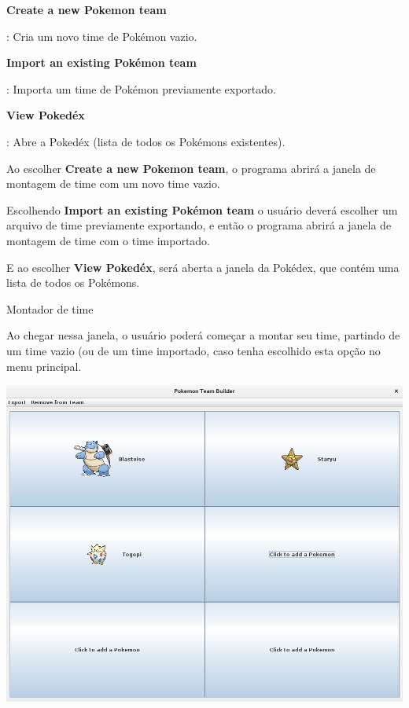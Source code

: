 \documentclass[
	article,			%
	12pt,				%
	oneside,			%
	a4paper,			%
	english,			%
	brazil,				%
	sumario=tradicional
	]{abntex2}
\begin{document}
\begin{itemize}

{\item\bfseries Create a new Pokemon team}: Cria um novo time de Pokémon vazio.

{\item\bfseries Import an existing Pokémon team}: Importa um time de Pokémon previamente exportado.

{\item\bfseries View Pokedéx}: Abre a Pokedéx (lista de todos os Pokémons existentes).

\end{itemize}

Ao escolher {\bfseries Create a new Pokemon team}, o programa abrirá a janela de montagem de time com um novo time vazio.

Escolhendo {\bfseries Import an existing Pokémon team} o usuário deverá escolher um arquivo de time previamente exportando, e então o programa abrirá a janela de montagem de time com o time importado.

E ao escolher {\bfseries View Pokedéx}, será aberta a janela da Pokédex, que contém uma lista de todos os Pokémons.

\newpage
\begin{center}
{\Large Montador de time}
\end{center}

Ao chegar nessa janela, o usuário poderá começar a montar seu time, partindo de um time vazio (ou de um time importado, caso tenha escolhido esta opção no menu principal.

\begin{center}
\includegraphics[width=1\textwidth]{team_half}\par
\end{center}
\end{document}
